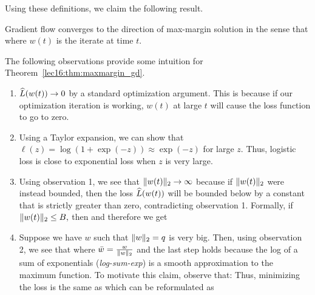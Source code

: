 Using these definitions, we claim the following result.
\begin{theorem} \label{lec16:thm:maxmargin_gd}
Gradient flow converges to the direction of max-margin solution in the sense that
where \(w(t)\) is the iterate at time \(t\).
\end{theorem}

The following observations provide some intuition for Theorem~\ref{lec16:thm:maxmargin_gd}.
\begin{enumerate}
    \item \(\widehat{L}(w(t)) \to 0\) by a standard optimization argument. This is because if our optimization iteration is working, \(w(t)\) at large \(t\) will cause the loss function to go to zero.
    \item Using a Taylor expansion, we can show that \( \ell(z) = \log(1 + \exp(-z)) \approx \exp(-z)\) for large \(z\). Thus, logistic loss is close to exponential loss when \(z\) is very large.
    \item Using observation 1, we see that \(\|w(t)\|_{2} \to \infty\) because if \(\|w(t)\|_{2}\) were instead bounded, then the loss \(\widehat{L} (w(t))\) will be bounded below by a constant that is strictly greater than zero, contradicting observation 1. Formally, if
    \(\|w(t)\|_{2} \leq B,\)
    then
    and therefore we get
    \item Suppose we have \(w\) such that \(\|w\|_{2} = q \) is very big. Then, using observation 2, we see that
    where \( \bar{w} = \frac{w}{\|w\|_{2}}\) and the last step holds because the log of a sum of exponentials (\textit{log-sum-exp}) is a smooth approximation to the maximum function. To motivate this claim, observe that:  
    Thus, minimizing the loss is the same as
    which can be reformulated as

\end{enumerate}

